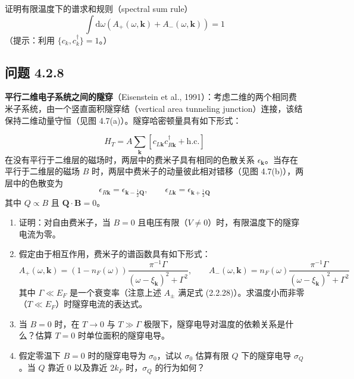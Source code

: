 证明有限温度下的谱求和规则（spectral sum rule）
\begin{equation*}
\int \mathrm{d}\omega \left(A_{+}(\omega,\pmb{k}) + A_{-}(\omega,\pmb{k})\right) = 1
\end{equation*}
（提示：利用 $\{c_{k}, c_{k}^{\dagger}\} = 1$。）

\subsection*{问题 4.2.8}

\textbf{平行二维电子系统之间的隧穿}（Eisenstein et al., 1991）：考虑二维的两个相同费米子系统，由一个竖直面积隧穿结（vertical area tunneling junction）连接，该结保持二维动量守恒（见图 4.7(a)）。隧穿哈密顿量具有如下形式：


\begin{equation*}
H_{T} = A \sum_{\pmb{k}}\left[c_{L\pmb{k}}c_{R\pmb{k}}^{\dagger} + \text{h.c.}\right]
\end{equation*}
在没有平行于二维层的磁场时，两层中的费米子具有相同的色散关系 $\epsilon_{\pmb{k}}$。当存在平行于二维层的磁场 $B$ 时，两层中费米子的动量彼此相对错移（见图 4.7(b)），两层中的色散变为
\begin{equation*}
\epsilon_{R\pmb{k}} = \epsilon_{\pmb{k} - \frac{1}{2}\pmb{Q}}, \qquad \epsilon_{L\pmb{k}} = \epsilon_{\pmb{k} + \frac{1}{2}\pmb{Q}}
\end{equation*}
其中 $Q \propto B$ 且 $\pmb{Q} \cdot \pmb{B} = 0$。

\begin{enumerate}
\item 证明：对自由费米子，当 $B = 0$ 且电压有限（$V \neq 0$）时，有限温度下的隧穿电流为零。
\item 假定由于相互作用，费米子的谱函数具有如下形式：
\begin{equation*}
A_{+}(\omega,\pmb{k}) = (1 - n_{F}(\omega))\frac{\pi^{-1}\Gamma}{(\omega - \xi_{\pmb{k}})^{2} + \Gamma^{2}}, \qquad A_{-}(\omega,\pmb{k}) = n_{F}(\omega)\frac{\pi^{-1}\Gamma}{(\omega - \xi_{\pmb{k}})^{2} + \Gamma^{2}}
\end{equation*}
其中 $\Gamma \ll E_{F}$ 是一个衰变率（注意上述 $A_{\pm}$ 满足式 (2.2.28)）。求温度小而非零（$T \ll E_{F}$）时隧穿电流的表达式。
\item 当 $B = 0$ 时，在 $T \to 0$ 与 $T \gg \Gamma$ 极限下，隧穿电导对温度的依赖关系是什么？估算 $T = 0$ 时单位面积的隧穿电导。
\item 假定零温下 $B = 0$ 时的隧穿电导为 $\sigma_{0}$，试以 $\sigma_{0}$ 估算有限 $Q$ 下的隧穿电导 $\sigma_{Q}$。当 $Q$ 靠近 0 以及靠近 $2k_{F}$ 时，$\sigma_{Q}$ 的行为如何？
\end{enumerate}

